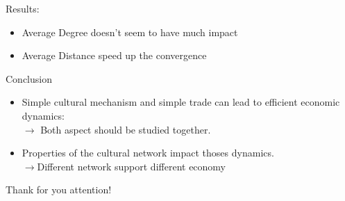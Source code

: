 \documentclass[12pt, notes=show]{beamer}
\begin{document}
	\begin{frame}{Results: }
		\begin{itemize}
				\vfill
			\item Average Degree doesn't seem to have much impact
				\vfill
			\item Average Distance speed up the convergence
		\end{itemize}

	\end{frame}



	\begin{frame}{Conclusion}
		\begin{itemize}
			\item Simple cultural mechanism and simple trade can lead to efficient economic dynamics:\\
				{$\rightarrow$ \small Both aspect should be studied together.}
				\vfill
			\item Properties of the cultural network impact thoses dynamics.\\
				{$\rightarrow$\small Different network support different economy}
				\vfill
		\end{itemize}

	\end{frame}
	\begin{frame}{}
		\begin{center}
			\huge
			Thank for you attention!\\
		\end{center}


	\end{frame}

	
\end{document}
